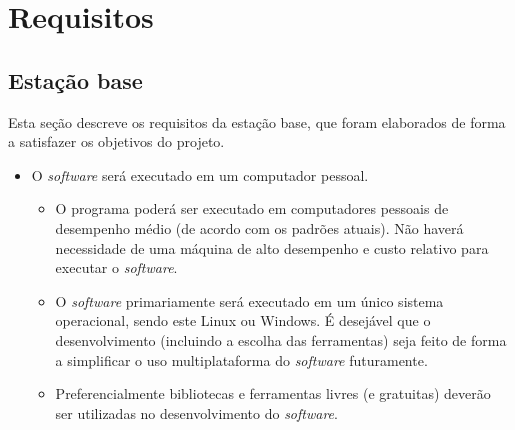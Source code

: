 \section{Requisitos}


\subsection{Estação base}
\label{subsec:req_estacao-base}
%
Esta seção descreve os requisitos da estação base, que foram elaborados de forma a satisfazer os objetivos do projeto.

\begin{itemize} %

  \item O \textit{software} será executado em um computador pessoal.
    \begin{itemize}
      \item O programa poderá ser executado em computadores pessoais de desempenho médio (de acordo com os padrões atuais). Não haverá necessidade de uma máquina de alto desempenho e custo relativo para executar o \textit{software}. %
      \item O \textit{software} primariamente será executado em um único sistema operacional, sendo este Linux ou Windows. É desejável que o desenvolvimento (incluindo a escolha das ferramentas) seja feito de forma a simplificar o uso multiplataforma do \textit{software} futuramente. 
      \item Preferencialmente bibliotecas e ferramentas livres (e gratuitas) deverão ser utilizadas no desenvolvimento do \textit{software}.
    \end{itemize}


\end{itemize}
